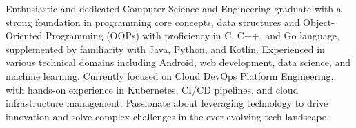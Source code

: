 

\begin{cvparagraph}

Enthusiastic and dedicated Computer Science and Engineering graduate with a strong foundation in programming core concepts, data structures and Object-Oriented Programming (OOPs) with proficiency in C, C++, and Go language, supplemented by familiarity with Java, Python, and Kotlin.
Experienced in various technical domains including Android, web development, data science, and machine learning. Currently focused on Cloud DevOps Platform Engineering, with hands-on experience in Kubernetes, CI/CD pipelines, and cloud infrastructure management. Passionate about leveraging technology to drive innovation and solve complex challenges in the ever-evolving tech landscape.
\end{cvparagraph}
